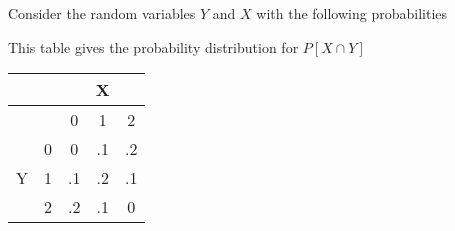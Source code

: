 \question Consider the random variables $Y$ and $X$ with the following 
probabilities

This table gives the probability distribution for $P[X \cap Y]$

\begin{center}
\begin{tabular}{ | c | c | c | c | c |}
\hline
\cellcolor{black}& \cellcolor{black} & \multicolumn{3}{c|}{X} \\  
\hline
\cellcolor{black}& \cellcolor{black}& 0 & 1 & 2 \\
 \hline
 \multirow{3}{*}{Y} & 0 & 0 & .1 & .2 \\

 &1 & .1 & .2 & .1 \\

 &2 & .2 & .1 & 0 \\
  \hline
\end{tabular}
\end{center}


